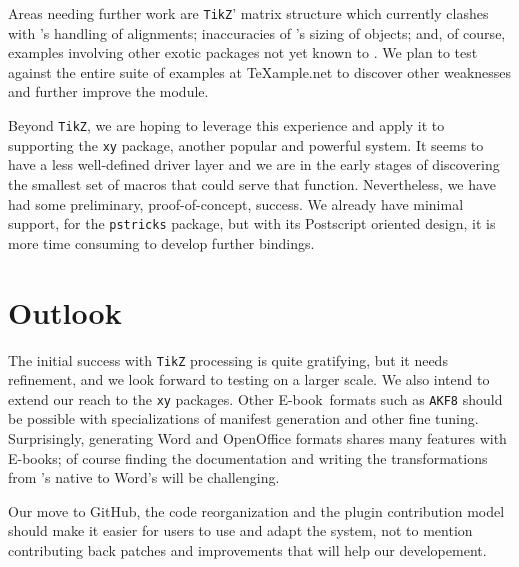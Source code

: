 \documentclass{llncs}
\def\ebook{\mbox{E-book}\xspace}
\def\tikz{\texttt{TikZ}\xspace}
\begin{document}
Areas needing further work are \tikz' matrix
structure which currently clashes with \LaTeXML's handling
of alignments; inaccuracies of \LaTeXML's sizing of objects;
and, of course, examples involving other exotic packages
not yet known to \LaTeXML.  We plan to test against
the entire suite of examples at {\TeX}ample.net to discover
other weaknesses and further improve the module.

Beyond \tikz, we are hoping to leverage this experience and apply
it to supporting the \texttt{xy} package, another
popular and powerful system.  It seems to have a less
well-defined driver layer and we are in the early stages of
discovering the smallest set of macros that could serve that
function. Nevertheless, we have had some preliminary, proof-of-concept, success.
We already have minimal support, for the \texttt{pstricks}
package, but with its Postscript oriented design,
it is more time consuming to develop further bindings.

\section{Outlook}
The initial success with \tikz processing is quite
gratifying, but it needs refinement, and we look forward to testing
on a larger scale. We also intend
to extend our reach to the \texttt{xy} packages.
Other \ebook\ formats such as \texttt{AKF8} should be possible with
specializations of manifest generation and other fine tuning.
Surprisingly, generating Word and OpenOffice formats shares many features
with {\ebook}s; of course finding the documentation and writing the {\XSLT}
transformations from \LaTeXML's native {\XML} to Word's will be challenging.

Our move to GitHub, the code reorganization and the plugin contribution model should make it easier
for users to use and adapt the system, not to mention contributing
back patches and improvements that will help our developement.

\printbibliography
\end{document}
